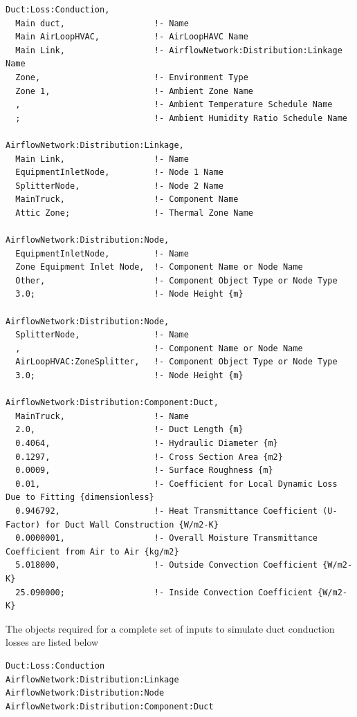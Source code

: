 \begin{lstlisting}
Duct:Loss:Conduction,
  Main duct,                  !- Name
  Main AirLoopHVAC,           !- AirLoopHAVC Name
  Main Link,                  !- AirflowNetwork:Distribution:Linkage Name
  Zone,                       !- Environment Type
  Zone 1,                     !- Ambient Zone Name
  ,                           !- Ambient Temperature Schedule Name
  ;                           !- Ambient Humidity Ratio Schedule Name

AirflowNetwork:Distribution:Linkage,
  Main Link,                  !- Name
  EquipmentInletNode,         !- Node 1 Name
  SplitterNode,               !- Node 2 Name
  MainTruck,                  !- Component Name
  Attic Zone;                 !- Thermal Zone Name

AirflowNetwork:Distribution:Node,
  EquipmentInletNode,         !- Name
  Zone Equipment Inlet Node,  !- Component Name or Node Name
  Other,                      !- Component Object Type or Node Type
  3.0;                        !- Node Height {m}

AirflowNetwork:Distribution:Node,
  SplitterNode,               !- Name
  ,                           !- Component Name or Node Name
  AirLoopHVAC:ZoneSplitter,   !- Component Object Type or Node Type
  3.0;                        !- Node Height {m}

AirflowNetwork:Distribution:Component:Duct,
  MainTruck,                  !- Name
  2.0,                        !- Duct Length {m}
  0.4064,                     !- Hydraulic Diameter {m}
  0.1297,                     !- Cross Section Area {m2}
  0.0009,                     !- Surface Roughness {m}
  0.01,                       !- Coefficient for Local Dynamic Loss Due to Fitting {dimensionless}
  0.946792,                   !- Heat Transmittance Coefficient (U-Factor) for Duct Wall Construction {W/m2-K}
  0.0000001,                  !- Overall Moisture Transmittance Coefficient from Air to Air {kg/m2}
  5.018000,                   !- Outside Convection Coefficient {W/m2-K}
  25.090000;                  !- Inside Convection Coefficient {W/m2-K}
\end{lstlisting}

The objects required for a complete set of inputs to simulate duct conduction losses are listed below

\begin{lstlisting}
Duct:Loss:Conduction
AirflowNetwork:Distribution:Linkage
AirflowNetwork:Distribution:Node
AirflowNetwork:Distribution:Component:Duct

\end{lstlisting}


